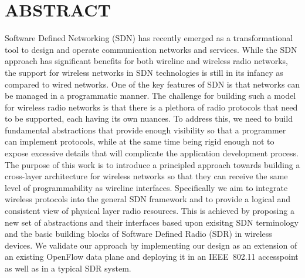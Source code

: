 %
%
%

\chapter*{ABSTRACT}

\pagestyle{plain} %
\setcounter{page}{2}

\indent Software Defined Networking (SDN) has recently emerged as a transformational tool to design and operate communication networks and services. While the SDN approach has significant benefits for both wireline and wireless radio networks, the support for  wireless networks in SDN technologies is still in its infancy as compared to wired networks. One of the key features of SDN is that networks can be managed in a programmatic manner. The challenge for building such a model for wireless radio networks is that there is a plethora of radio protocols that need to be supported, each having its own nuances. To address this, we need to build fundamental abstractions that provide enough visibility so that a programmer can implement protocols, while at the same time being rigid enough not to expose excessive details that will complicate the application development process.
The purpose of this work is to introduce a principled approach towards building a cross-layer architecture for wireless networks so that they can receive the same level of programmability as wireline interfaces. Specifically we aim to integrate wireless protocols into the general SDN framework and to provide a logical and consistent view of physical layer radio resources. This is achieved by proposing a new set of abstractions and their interfaces based upon exisitng SDN terminology and the basic building blocks of Software Defined Radio (SDR) in wireless devices.  
We validate our approach by implementing our design as an extension of an existing OpenFlow data plane and deploying it in an IEEE~802.11 accesspoint as well as in a typical SDR system.   

\pagebreak{}
